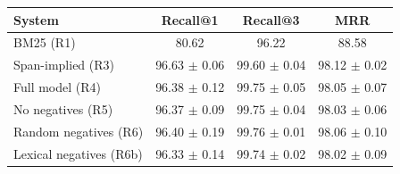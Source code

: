 \begin{tabular}{lccc}
\hline
System & Recall@1 & Recall@3 & MRR \\
\hline
BM25 (R1) & 80.62 & 96.22 & 88.58 \\
Span-implied (R3) & 96.63 $\pm$ 0.06 & 99.60 $\pm$ 0.04 & 98.12 $\pm$ 0.02 \\
Full model (R4) & 96.38 $\pm$ 0.12 & 99.75 $\pm$ 0.05 & 98.05 $\pm$ 0.07 \\
No negatives (R5) & 96.37 $\pm$ 0.09 & 99.75 $\pm$ 0.04 & 98.03 $\pm$ 0.06 \\
Random negatives (R6) & 96.40 $\pm$ 0.19 & 99.76 $\pm$ 0.01 & 98.06 $\pm$ 0.10 \\
Lexical negatives (R6b) & 96.33 $\pm$ 0.14 & 99.74 $\pm$ 0.02 & 98.02 $\pm$ 0.09 \\
\hline
\end{tabular}
